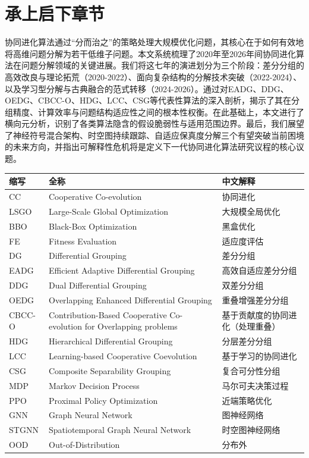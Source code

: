 \section{承上启下章节}

协同进化算法通过“分而治之”的策略处理大规模优化问题，其核心在于如何有效地将高维问题分解为若干低维子问题。本文系统梳理了2020年至2026年间协同进化算法在问题分解领域的关键进展。我们将这七年的演进划分为三个阶段：差分分组的高效改良与理论拓荒（2020-2022）、面向复杂结构的分解技术突破（2022-2024）、以及学习型分解与古典融合的范式转移（2024-2026）。通过对EADG、DDG、OEDG、CBCC-O、HDG、LCC、CSG等代表性算法的深入剖析，揭示了其在分组精度、计算效率与问题结构适应性之间的根本性权衡。在此基础上，本文进行了横向元分析，识别了各类算法隐含的假设脆弱性与适用范围边界。最后，我们展望了神经符号混合架构、时空图持续跟踪、自适应保真度分解三个有望突破当前困境的未来方向，并指出可解释性危机将是定义下一代协同进化算法研究议程的核心议题。

\begin{center}
\begin{tabular}{p{2cm}p{8cm}p{4cm}}
\toprule
\textbf{缩写} & \textbf{全称} & \textbf{中文解释} \\
\midrule
CC & Cooperative Co-evolution & 协同进化 \\
LSGO & Large-Scale Global Optimization & 大规模全局优化 \\
BBO & Black-Box Optimization & 黑盒优化 \\
FE & Fitness Evaluation & 适应度评估 \\
DG & Differential Grouping & 差分分组 \\
EADG & Efficient Adaptive Differential Grouping & 高效自适应差分分组 \\
DDG & Dual Differential Grouping & 双差分分组 \\
OEDG & Overlapping Enhanced Differential Grouping & 重叠增强差分分组 \\
CBCC-O & Contribution-Based Cooperative Co-evolution for Overlapping problems & 基于贡献度的协同进化（处理重叠） \\
HDG & Hierarchical Differential Grouping & 分层差分分组 \\
LCC & Learning-based Cooperative Coevolution & 基于学习的协同进化 \\
CSG & Composite Separability Grouping & 复合可分性分组 \\
MDP & Markov Decision Process & 马尔可夫决策过程 \\
PPO & Proximal Policy Optimization & 近端策略优化 \\
GNN & Graph Neural Network & 图神经网络 \\
STGNN & Spatiotemporal Graph Neural Network & 时空图神经网络 \\
OOD & Out-of-Distribution & 分布外 \\
\bottomrule
\end{tabular}
\end{center}


